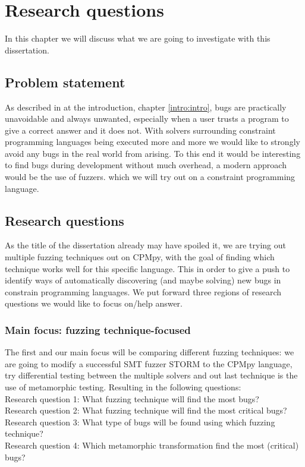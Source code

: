 \chapter{Research questions}
\label{cha:RQ}
\label{RQ:intro}
In this chapter we will discuss what we are going to investigate with this dissertation.

\section{Problem statement}\label{RQ:ProblemStatment}
As described in at the introduction, chapter \ref{intro:intro}, bugs are practically unavoidable and always unwanted, especially when a user trusts a program to give a correct answer and it does not. With solvers surrounding constraint programming languages being executed more and more we would like to strongly avoid any bugs in the real world from arising. To this end it would be interesting to find bugs during development without much overhead, a modern approach would be the use of fuzzers. which we will try out on a constraint programming language.

\section{Research questions}\label{RQ:RQ's}
As the title of the dissertation already may have spoiled it, we are trying out multiple fuzzing techniques out on CPMpy, with the goal of finding which technique works well for this specific language. This in order to give a push to identify ways of automatically discovering (and maybe solving) new bugs in constrain programming languages. We put forward three regions of research questions we would like to focus on/help answer.

\subsection{Main focus: fuzzing technique-focused}
The first and our main focus will be comparing different fuzzing techniques: we are going to modify a successful SMT fuzzer STORM to the CPMpy language, try differential testing between the multiple solvers and out last technique is the use of metamorphic testing. Resulting in the following questions: 
\\
Research question 1: What fuzzing technique will find the most bugs?\\ 
Research question 2: What fuzzing technique will find the most critical bugs?\\
Research question 3: What type of bugs will be found using which fuzzing technique?\\
Research question 4: Which metamorphic transformation find the most (critical) bugs?\\
